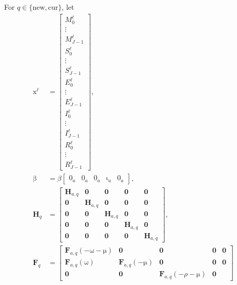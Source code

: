 \documentclass[USenglish]{article}
\renewcommand{\vec}[1]{\boldsymbol{\mathrm{#1}}}
\newcommand{\mat}[1]{\mathbf{#1}}
\begin{document}
For $q \in \{\mathrm{new}, \mathrm{cur}\}$, let
\begin{subequations}
  \begin{align}
    \vec{x}^{\ell} &=
    \begin{bmatrix}
      M_0^{\ell} \\ \vdots \\ M_{J - 1}^{\ell} \\
      S_0^{\ell} \\ \vdots \\ S_{J - 1}^{\ell} \\
      E_0^{\ell} \\ \vdots \\ E_{J - 1}^{\ell} \\
      I_0^{\ell} \\ \vdots \\ I_{J - 1}^{\ell} \\
      R_0^{\ell} \\ \vdots \\ R_{J - 1}^{\ell}
    \end{bmatrix},
    \\
    \vec{\beta} &=
    \beta
    \begin{bmatrix}
      \vec{0}_a & \vec{0}_a & \vec{0}_a & \vec{\iota}_a & \vec{0}_a
    \end{bmatrix},
    \\
    \mat{H}_{q} &=
    \begin{bmatrix}
      \mat{H}_{a, q} & \mat{0} & \mat{0} & \mat{0} & \mat{0} \\
      \mat{0} & \mat{H}_{a, q} & \mat{0} & \mat{0} & \mat{0} \\
      \mat{0} & \mat{0} & \mat{H}_{a, q} & \mat{0} & \mat{0} \\
      \mat{0} & \mat{0} & \mat{0} & \mat{H}_{a, q} & \mat{0}
      \\
      \mat{0} & \mat{0} & \mat{0} & \mat{0} & \mat{H}_{a, q}
    \end{bmatrix},
    \\
    \mat{F}_q &=
    \begin{bmatrix}
      \mat{F}_{a, q}(- \vec{\omega} - \vec{\mu}) & \mat{0} & \mat{0}
      & \mat{0} & \mat{0}
      \\
      \mat{F}_{a, q}(\vec{\omega}) & \mat{F}_{a, q}(- \vec{\mu}) & \mat{0}
      & \mat{0} & \mat{0}
      \\
      \mat{0} & \mat{0} & \mat{F}_{a, q}(- \rho - \vec{\mu}) & \mat{0}

\end{bmatrix}
\end{align}
\end{subequations}
\end{document}
